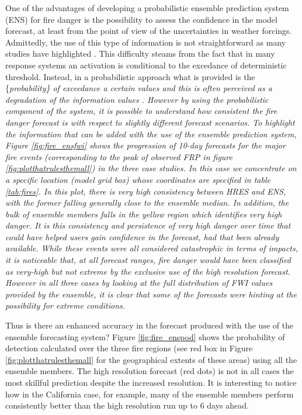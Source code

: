 \documentclass[, manuscript]{copernicus}
\begin{document}
One of the advantages of developing a probabilistic ensemble prediction
system (ENS) for fire danger is the possibility to assess the confidence
in the model forecast, at least from the point of view of the
uncertainties in weather forcings. Admittedly, the use of this type of
information is not straightforward as many studies have highlighted
\citep{pappenberger:13,palmer:00}. This difficulty steams from the fact
that in many response systems an activation is conditional to the
excedance of deterministic threshold. Instead, in a probabilistic
approach what is provided is the \{\it probability\} of exceedance a
certain values and this is often perceived as a degradation of the
information values \citep{richardson:00}. However by using the
probabilistic component of the system, it is possible to understand how
consistent the fire danger forecast is with respect to slightly
different forecast scenarios. To highlight the information that can be
added with the use of the ensemble prediction system, Figure
\ref{fig:fire_ensfwi} shows the progression of 10-day forecasts for the
major fire events (corresponding to the peak of observed FRP in figure
\ref{fig:plotthatrulesthemall}) in the three case studies. In this case
we concentrate on a specific location (model grid box) whose coordinates
are specified in table \ref{tab:fires}. In this plot, there is very high
consistency between HRES and ENS, with the former falling generally
close to the ensemble median. In addition, the bulk of ensemble members
falls in the yellow region which identifies very high danger. It is this
consistency and persistence of very high danger over time that could
have helped users gain confidence in the forecast, had that been already
available. While these events were all considered catastrophic in terms
of impacts, it is noticeable that, at all forecast ranges, fire danger
would have been classified as very-high but not extreme by the exclusive
use of the high resolution forecast. However in all three cases by
looking at the full distribution of FWI values provided by the ensemble,
it is clear that some of the forecasts were hinting at the possibility
for extreme conditions.

Thus is there an enhanced accuracy in the forecast produced with the use
of the ensemble forecasting system? Figure \ref{fig:fire_enspod} shows
the probability of detection calculated over the three fire regions (see
red box in Figure \ref{fig:plotthatrulesthemall} for the geographical
extents of these areas) using all the ensemble members. The high
resolution forecast (red dots) is not in all cases the most skillful
prediction despite the increased resolution. It is interesting to notice
how in the California case, for example, many of the ensemble members
perform consistently better than the high resolution run up to 6 days
ahead.
\end{document}
